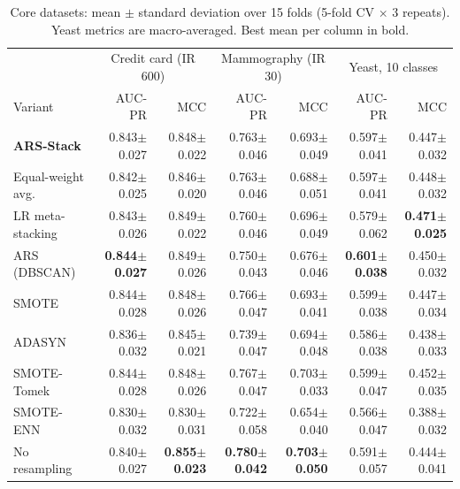 \begin{table}[t]\centering\small
\caption{Core datasets: mean $\pm$ standard deviation over 15 folds (5-fold CV $\times$ 3 repeats). Yeast metrics are macro-averaged. Best mean per column in bold.}
\label{tab:core}
\setlength{\tabcolsep}{3pt}\footnotesize
\begin{tabular}{lrrrrrr}
\toprule
& \multicolumn{2}{c}{Credit card (IR 600)} & \multicolumn{2}{c}{Mammography (IR 30)} & \multicolumn{2}{c}{Yeast, 10 classes} \\
Variant & AUC-PR & MCC & AUC-PR & MCC & AUC-PR & MCC \\
\midrule
\textbf{ARS-Stack} & 0.843$\pm$0.027 & 0.848$\pm$0.022 & 0.763$\pm$0.046 & 0.693$\pm$0.049 & 0.597$\pm$0.041 & 0.447$\pm$0.032 \\
Equal-weight avg. & 0.842$\pm$0.025 & 0.846$\pm$0.020 & 0.763$\pm$0.046 & 0.688$\pm$0.051 & 0.597$\pm$0.041 & 0.448$\pm$0.032 \\
LR meta-stacking & 0.843$\pm$0.026 & 0.849$\pm$0.022 & 0.760$\pm$0.046 & 0.696$\pm$0.049 & 0.579$\pm$0.062 & \textbf{0.471$\pm$0.025} \\
ARS (DBSCAN) & \textbf{0.844$\pm$0.027} & 0.849$\pm$0.026 & 0.750$\pm$0.043 & 0.676$\pm$0.046 & \textbf{0.601$\pm$0.038} & 0.450$\pm$0.032 \\
SMOTE & 0.844$\pm$0.028 & 0.848$\pm$0.026 & 0.766$\pm$0.047 & 0.693$\pm$0.041 & 0.599$\pm$0.038 & 0.447$\pm$0.034 \\
ADASYN & 0.836$\pm$0.032 & 0.845$\pm$0.021 & 0.739$\pm$0.047 & 0.694$\pm$0.048 & 0.586$\pm$0.038 & 0.438$\pm$0.033 \\
SMOTE-Tomek & 0.844$\pm$0.028 & 0.848$\pm$0.026 & 0.767$\pm$0.047 & 0.703$\pm$0.033 & 0.599$\pm$0.047 & 0.452$\pm$0.035 \\
SMOTE-ENN & 0.830$\pm$0.032 & 0.830$\pm$0.031 & 0.722$\pm$0.058 & 0.654$\pm$0.040 & 0.566$\pm$0.047 & 0.388$\pm$0.032 \\
No resampling & 0.840$\pm$0.027 & \textbf{0.855$\pm$0.023} & \textbf{0.780$\pm$0.042} & \textbf{0.703$\pm$0.050} & 0.591$\pm$0.057 & 0.444$\pm$0.041 \\
\bottomrule
\end{tabular}
\end{table}